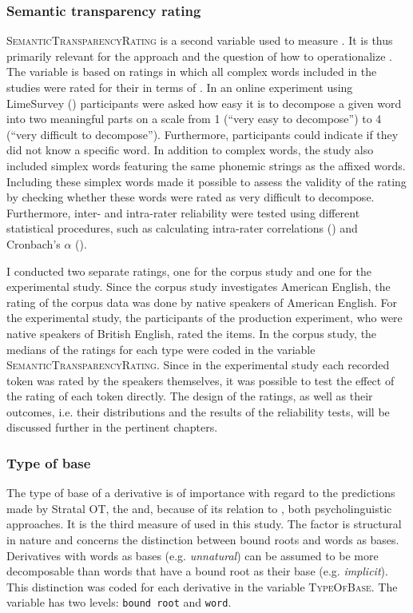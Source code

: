 \subsubsection{Semantic transparency rating} \textsc{SemanticTransparencyRating} is a second variable used to measure . It is thus primarily relevant for the  approach and the question of how to operationalize .  
 The variable is based on ratings in which all complex words included in the studies were rated for their  in terms of .
  In an online experiment using LimeSurvey (\citealt{LimeSurveyProjectTeam.2015}) participants  were asked how easy it is to decompose a given word into two meaningful parts on a scale from 1 (``very easy to decompose'') to 4 (``very difficult to decompose''). Furthermore, participants could indicate if they did not know a specific word. In addition to complex words, the study also included simplex words featuring the same phonemic strings as the affixed words. Including these simplex words made it possible to assess the validity of the rating by checking whether these words were rated as very difficult to decompose. Furthermore, inter- and intra-rater reliability were tested using different statistical procedures, such as calculating intra-rater correlations (\citealt{Bartko.1966}) and Cronbach's $\alpha$ (\citealt{Cronbach.1951}). 

I conducted two separate ratings, one for the corpus study and one for the experimental study. Since the corpus study investigates American English, the rating of the corpus data was done by native speakers of American English. For the experimental study, the participants of the production experiment, who were native speakers of British English, rated the items. 
In the corpus study, the medians of the ratings for each type were coded in the variable \textsc{SemanticTransparencyRating}. Since in the experimental study each recorded token was rated by the speakers themselves, it was possible to test the effect of the rating of each token directly.
The design of the ratings, as well as their outcomes, i.e. their distributions and the results of the reliability tests, will be discussed further in the pertinent chapters.


\subsubsection{Type of base} 
The type of base of a derivative is of importance with regard to the predictions made by Stratal OT, the  and, because of its relation to , both psycholinguistic approaches. It is
the third measure of  used in this study. The factor is structural in nature and concerns the distinction between bound roots and words as bases. Derivatives with words as bases  (e.g. \textit{unnatural}) can be assumed to be more decomposable than words that have a bound root as their base  (e.g. \textit{implicit}). This distinction was coded for each derivative in the variable \textsc{TypeOfBase}. The variable has two levels: \texttt{bound root} and \texttt{word}.


